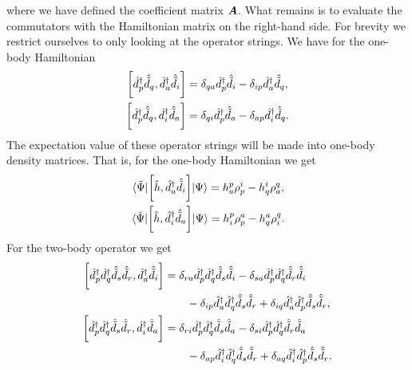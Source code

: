             where we have defined the coefficient matrix $\boldsymbol{A}$.
            What remains is to evaluate the commutators with the Hamiltonian
            matrix on the right-hand side.
            For brevity we restrict ourselves to only looking at the operator
            strings.
            We have for the one-body Hamiltonian
            \begin{gather}
                \left[\hat{d}^{\dagger}_{p}\hat{\tilde{d}}_{q}, \hat{d}^{\dagger}_{a}\hat{\tilde{d}}_{i}\right]
                = \delta_{qa}\hat{d}^{\dagger}_{p}\hat{\tilde{d}}_{i}
                - \delta_{ip}\hat{d}^{\dagger}_{a}\hat{\tilde{d}}_{q}, \\
                \left[\hat{d}^{\dagger}_{p}\hat{\tilde{d}}_{q}, \hat{d}^{\dagger}_{i}\hat{\tilde{d}}_{a}\right]
                = \delta_{qi}\hat{d}^{\dagger}_{p}\hat{\tilde{d}}_{a}
                - \delta_{ap}\hat{d}^{\dagger}_{i}\hat{\tilde{d}}_{q}.
            \end{gather}
            The expectation value of these operator strings will be made into
            one-body density matrices.
            That is, for the one-body Hamiltonian we get
            \begin{gather}
                \mel*{\tilde{\Psi}}{
                    \left[
                        \hat{h}
                    , 
                        \hat{d}^{\dagger}_{a}
                        \hat{\tilde{d}}_{i}
                    \right]
                }{\Psi}
                = h^{p}_{a}\rho^{i}_{p}
                - h^{i}_{q}\rho^{q}_{a},
                \\
                \mel*{\tilde{\Psi}}{
                    \left[
                        \hat{h}
                    , 
                        \hat{d}^{\dagger}_{i}
                        \hat{\tilde{d}}_{a}
                    \right]
                }{\Psi}
                =
                h^{p}_{i}\rho^{a}_{p}
                -
                h^{a}_{q}\rho^{q}_{i}.
            \end{gather}
            For the two-body operator we get
            \begin{align}
                \left[\hat{d}^{\dagger}_{p}\hat{d}^{\dagger}_{q}\hat{\tilde{d}}_{s}\hat{\tilde{d}}_{r}, \hat{d}^{\dagger}_{a}\hat{\tilde{d}}_{i}\right]
                &=
                \delta_{ra}\hat{d}^{\dagger}_{p}\hat{d}^{\dagger}_{q}\hat{\tilde{d}}_{s}\hat{\tilde{d}}_{i}
                - \delta_{sa}\hat{d}^{\dagger}_{p}\hat{d}^{\dagger}_{q}\hat{\tilde{d}}_{r}\hat{\tilde{d}}_{i}
                \nonumber \\
                &\qquad
                - \delta_{ip}\hat{d}^{\dagger}_{a}\hat{d}^{\dagger}_{q}\hat{\tilde{d}}_{s}\hat{\tilde{d}}_{r}
                + \delta_{iq}\hat{d}^{\dagger}_{a}\hat{d}^{\dagger}_{p}\hat{\tilde{d}}_{s}\hat{\tilde{d}}_{r},
                \\
                \left[\hat{d}^{\dagger}_{p}\hat{d}^{\dagger}_{q}\hat{\tilde{d}}_{s}\hat{\tilde{d}}_{r}, \hat{d}^{\dagger}_{i}\hat{\tilde{d}}_{a}\right]
                &=
                \delta_{ri}\hat{d}^{\dagger}_{p}\hat{d}^{\dagger}_{q}\hat{\tilde{d}}_{s}\hat{\tilde{d}}_{a}
                - \delta_{si}\hat{d}^{\dagger}_{p}\hat{d}^{\dagger}_{q}\hat{\tilde{d}}_{r}\hat{\tilde{d}}_{a}
                \nonumber \\
                &\qquad
                - \delta_{ap}\hat{d}^{\dagger}_{i}\hat{d}^{\dagger}_{q}\hat{\tilde{d}}_{s}\hat{\tilde{d}}_{r}
                + \delta_{aq}\hat{d}^{\dagger}_{i}\hat{d}^{\dagger}_{p}\hat{\tilde{d}}_{s}\hat{\tilde{d}}_{r}.
            \end{align}
